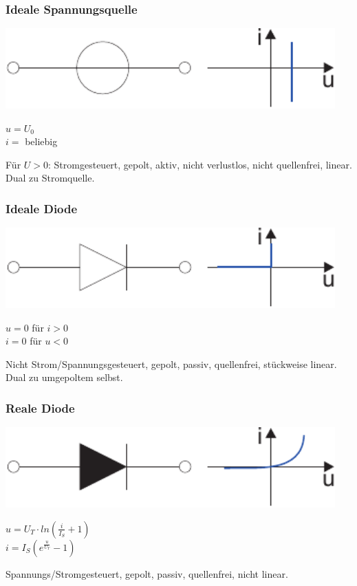 \documentclass[a4paper,twocolumn,10pt]{article}
\begin{document}
\subsubsection*{Ideale Spannungsquelle}
\begin{minipage}[b]{0.26\textwidth}
\includegraphics[width=0.95\textwidth]{Grafiken/Spannungsquelle}
\end{minipage}
\hfill
\begin{minipage}[b]{0.2\textwidth}
$u=U_0$\\
$i=$ beliebig
\end{minipage}
Für $U>0$: Stromgesteuert, gepolt, aktiv, nicht verlustlos, nicht quellenfrei, linear. Dual zu Stromquelle.

\subsubsection*{Ideale Diode}
\begin{minipage}[b]{0.26\textwidth}
\includegraphics[width=0.95\textwidth]{Grafiken/IdealeDiode}
\end{minipage}
\hfill
\begin{minipage}[b]{0.2\textwidth}
$u=0$ für $i>0$\\
$i=0$ für $u<0$
\end{minipage}
Nicht Strom/Spannungsgesteuert, gepolt, passiv, quellenfrei, stückweise linear. Dual zu umgepoltem selbst.

\subsubsection*{Reale Diode}
\begin{minipage}[b]{0.26\textwidth}
\includegraphics[width=0.95\textwidth]{Grafiken/RealeDiode}
\end{minipage}
\hfill
\begin{minipage}[b]{0.2\textwidth}
$u=U_T\cdot ln(\frac{i}{I_S}+1)$\\
$i=I_S(e^{\frac{u}{U_T}}-1)$
\end{minipage}
Spannungs/Stromgesteuert, gepolt, passiv, quellenfrei, nicht linear.
\end{document}
